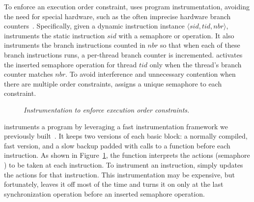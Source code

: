 
To enforce an execution order constraint, \peregrine uses program
instrumentation, avoiding the need for special hardware, such as the often
imprecise hardware branch counters~\cite{smp-revirt:vee08}.
Specifically, given a dynamic instruction instance $\langle sid, tid, nbr \rangle$, \peregrine
instruments the static instruction $sid$ with a semaphore  or
 operation. 
It also instruments the branch instructions counted in $nbr$ so that when
each of these branch instructions runs, a per-thread branch counter is
incremented.  \peregrine activates the inserted semaphore operation for thread
$tid$ only when the thread's branch counter matches $nbr$.  To avoid
interference and unnecessary contention when there are multiple order
constraints, \peregrine assigns a unique semaphore to each constraint.

\begin{figure}[t]
\centering
\begin{minipage}{0.45\textwidth}
\tiny {}
\end{minipage}
\vspace{-.1in}
\caption{\emph{Instrumentation to enforce execution order
    constraints.}} \label{fig:slot}
\vspace{-.1in}
\end{figure}

\peregrine instruments a program by leveraging a fast instrumentation framework we
previously built~\cite{wu:loom:osdi10}.  It keeps two versions of each
basic block: a normally compiled, fast version, and a slow backup
padded with calls to a  function before each instruction.  As
shown in Figure~\ref{fig:slot}, the  function interprets the
actions (semaphore ) to be taken at each instruction.  To
instrument an instruction, \peregrine simply updates the actions for that 
instruction.  This instrumentation may be expensive, but fortunately, \peregrine
leaves it off most of the time and turns it on only at the last
synchronization operation before an inserted semaphore operation.

